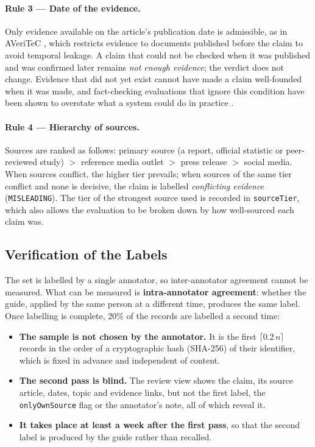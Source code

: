 \paragraph{Rule 3 --- Date of the evidence.}
Only evidence available on the article's publication date is
admissible, as in AVeriTeC \cite{schlichtkrull2023averitec}, which
restricts evidence to documents published before the claim to avoid
temporal leakage. A claim that could not be checked when it was
published and was confirmed later remains \emph{not enough evidence};
the verdict does not change. Evidence that did not yet exist cannot
have made a claim well-founded when it was made, and fact-checking
evaluations that ignore this condition have been shown to overstate
what a system could do in practice \cite{glockner2022missing}.

\paragraph{Rule 4 --- Hierarchy of sources.}
Sources are ranked as follows: primary source (a report, official
statistic or peer-reviewed study) $>$ reference media outlet $>$
press release $>$ social media. When sources conflict, the higher
tier prevails; when sources of the same tier conflict and none is
decisive, the claim is labelled \emph{conflicting evidence}
(\texttt{MISLEADING}). The tier of the strongest source used is
recorded in \texttt{sourceTier}, which also allows the evaluation to
be broken down by how well-sourced each claim was.

\subsection{Verification of the Labels}
\label{subsec:custom-review}

The set is labelled by a single annotator, so inter-annotator
agreement cannot be measured. What can be measured is
\textbf{intra-annotator agreement}: whether the guide, applied by the
same person at a different time, produces the same label. Once
labelling is complete, 20\% of the records are labelled a second
time:

\begin{itemize}
    \item \textbf{The sample is not chosen by the annotator.} It is
    the first $\lceil 0.2\,n \rceil$ records in the order of a
    cryptographic hash (SHA-256) of their identifier, which is fixed
    in advance and independent of content.
    \item \textbf{The second pass is blind.} The review view shows
    the claim, its source article, dates, topic and evidence links,
    but not the first label, the \texttt{onlyOwnSource} flag or the
    annotator's note, all of which reveal it.
    \item \textbf{It takes place at least a week after the first
    pass}, so that the second label is produced by the guide rather
    than recalled.
\end{itemize}

